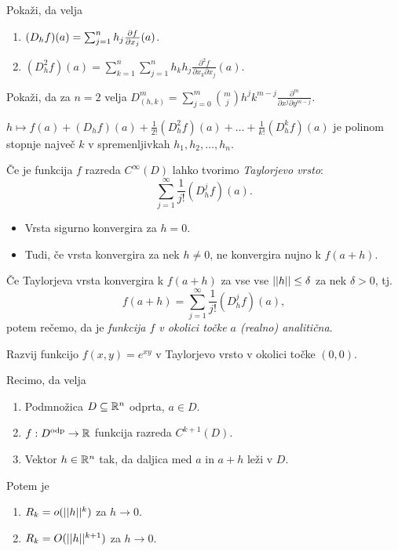 \begin{opomba}
    Pokaži, da velja
    \begin{enumerate}
        \item $(D_hf)(a) = \sum_{j=1}^{n}h_j \frac{\partial f}{\partial x_j}(a)$.
        \item $(D_h^2f)(a) = \sum_{k=1}^{n} \sum_{j=1}^{n}h_kh_j \frac{\partial^2f}{\partial x_k \partial x_j}(a)$. 
    \end{enumerate}
\end{opomba}

\begin{primer}
    Pokaži, da za $n=2$ velja $D_{(h,k)}^m = \sum_{j=0}^{m} \binom{m}{j} h^j k^{m-j} \frac{\partial^m}{\partial x^j \partial y^{m-j}}$.
\end{primer}

\begin{opomba}
    $h \mapsto f(a) + (D_hf)(a) + \frac{1}{2!}(D_h^2f)(a) + \ldots + \frac{1}{k!} (D_h^kf)(a) $ je polinom stopnje največ $k$ v spremenljivkah $h_1, h_2, \ldots, h_n$.
\end{opomba}

\begin{opomba}
    Če je funkcija $f$ razreda $C^\infty(D)$ lahko tvorimo \emph{Taylorjevo vrsto}:
    $$\sum_{j=1}^{\infty} \frac{1}{j!} (D_h^j f)(a).$$
    \begin{itemize}
        \item Vrsta sigurno konvergira za $h=0$.
        \item Tudi, če vrsta konvergira za nek $h \neq 0$, ne konvergira nujno k $f(a+h)$.
    \end{itemize}
\end{opomba}

\begin{definicija}
    Če Taylorjeva vrsta konvergira k $f(a+h)$ za vse vse $||h|| \leq \delta$ za nek $\delta > 0$, tj. 
    $$f(a+h) = \sum_{j=1}^{\infty} \frac{1}{j!} (D_h^j f)(a),$$
    potem rečemo, da je \emph{funkcija $f$ v okolici točke $a$ (realno) analitična}.
\end{definicija}

\begin{zgled}
    Razvij funkcijo $f(x,y) = e^{xy}$ v Taylorjevo vrsto v okolici točke $(0,0)$.
\end{zgled}

\begin{posledica}
    Recimo, da velja
    \begin{enumerate}
        \item Podmnožica $D \subseteq \mathbb{R}^n$ odprta, $a \in D$.
        \item $f: D^{\text{odp}} \to \mathbb{R}$ funkcija razreda $C^{k+1}(D)$.
        \item Vektor $h \in \mathbb{R}^n$ tak, da daljica med $a$ in $a+h$ leži v $D$.
    \end{enumerate}
    Potem je 
    \begin{enumerate}
        \item $R_k = o(||h||^k)$ za $h \to 0$.
        \item $R_k = O(||h||^{k+1})$ za $h \to 0$.
    \end{enumerate}
\end{posledica}

